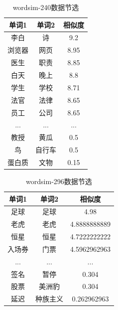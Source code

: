 \begin{table}[h]
    \caption{wordsim-240数据节选}
    \begin{tabular}{|c|c|c|}
        \hline
        单词1 & 单词2 & 相似度 \\
        \hline
        李白 & 诗 & 9.2 \\
        \hline
        浏览器 & 网页 & 8.95 \\
        \hline
        医生 & 职责 & 8.85 \\
        \hline
        白天 & 晚上 & 8.8 \\
        \hline
        学生 & 学校 & 8.71 \\
        \hline
        法官 & 法律 & 8.65 \\
        \hline
        员工 & 公司 & 8.65 \\
        \hline
        ... & ... & ... \\
        \hline
        教授 & 黄瓜 & 0.5 \\
        \hline
        鸟 & 自行车 & 0.5 \\
        \hline
        蛋白质 & 文物 & 0.15 \\
        \hline
    \end{tabular}
    \label{wordsim-240_form}
    \end{table}

\begin{table}[h]
\caption{wordsim-296数据节选}
\begin{tabular}{|c|c|c|}
    \hline
    单词1 & 单词2 & 相似度 \\
    \hline
    足球 & 足球 & 4.98 \\
    \hline
    老虎 & 老虎 & 4.8888888889 \\
    \hline
    恒星 & 恒星 & 4.7222222222 \\
    \hline
    入场券 & 门票 & 4.5962962963 \\
    \hline
    ... & ... & ... \\
    \hline
    签名 & 暂停 & 0.304 \\
    \hline
    股票 & 美洲豹 & 0.304 \\
    \hline
    延迟 & 种族主义 & 0.262962963 \\
    \hline
\end{tabular}
\label{wordsim-296_form}
\end{table}

